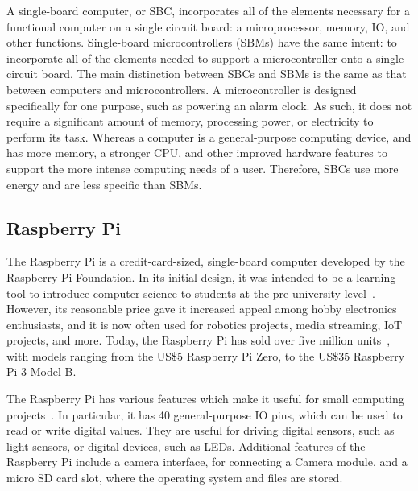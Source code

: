 \documentclass[12pt]{report}
\let\Oldsubsection\subsection
\renewcommand{\subsection}{\FloatBarrier\Oldsubsection}
\begin{document}
A single-board computer, or SBC, incorporates all of the elements necessary for a functional 
computer on a single circuit board: a microprocessor, memory, IO, and other functions. Single-board microcontrollers
(SBMs) have the same intent: to incorporate all of the elements needed to support a microcontroller onto a single
circuit board. The main distinction between SBCs and SBMs is the same as that between computers and microcontrollers.
A microcontroller is designed specifically for one purpose, such as powering an alarm clock. As such, it does not 
require a significant amount of memory, processing power, or electricity to perform its task. Whereas a computer is a 
general-purpose computing device, and has more memory, a stronger CPU, and other improved hardware features to support 
the more intense computing needs of a user. Therefore, SBCs use more energy and are less specific than SBMs.


\subsection{Raspberry Pi} \label{raspberry-pi}

The Raspberry Pi is a credit-card-sized, single-board computer developed by the Raspberry Pi Foundation. In its initial 
design, it was intended to be a learning tool to introduce computer science to students at the pre-university 
level~\autocite{RPISTART}. However, its reasonable price gave it increased appeal among hobby electronics enthusiasts, 
and it is now often used for robotics projects, media streaming, IoT projects, and more. Today, the Raspberry Pi has 
sold over five million units~\autocite{RPISALES}, with models ranging from the US\$5 Raspberry Pi Zero, to the US\$35 
Raspberry Pi 3 Model B.

The Raspberry Pi has various features which make it useful for small computing projects~\autocite{RPIFEATURES}. In 
particular, it has 40 general-purpose IO pins, which can be used to read or write digital values. They are useful for 
driving digital sensors, such as light sensors, or digital devices, such as LEDs. Additional features of the Raspberry 
Pi include a camera interface, for connecting a Camera module, and a micro SD card slot, where the operating system and 
files are stored. 

\end{document}
